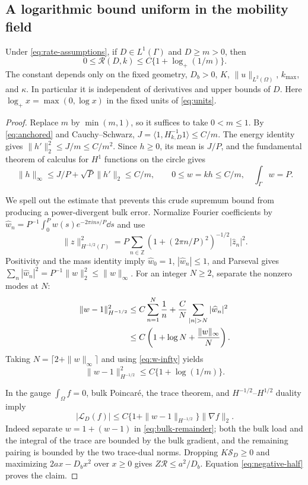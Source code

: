 \subsection{A logarithmic bound uniform in the mobility field}
\begin{theorem}\label{thm:log-remainder}
Under \eqref{eq:rate-assumptions}, if $D\in L^1(\Gamma)$ and
$D\ge m>0$, then
\begin{equation}\label{eq:log-remainder}
 0\le\mathcal R(D,k)\le C\{1+\log_+(1/m)\}.
\end{equation}
The constant depends only on the fixed geometry, $D_b>0$, $K$,
$\|u\|_{L^2(\Omega)}$, $k_{\max}$, and $\kappa$.
In particular it is independent of derivatives and upper bounds of $D$.
Here $\log_+x=\max(0,\log x)$ in the fixed units of \eqref{eq:units}.
\end{theorem}
\begin{proof}
Replace $m$ by $\min(m,1)$, so it suffices to take $0<m\le1$.
By \eqref{eq:anchored} and Cauchy--Schwarz,
$J=\langle1,H_{k,D}^{-1}1\rangle\le C/m$.
The energy identity gives $\|h'\|_2^2\le J/m\le C/m^2$.
Since $h\ge0$, its mean is $J/P$, and the fundamental theorem of
calculus for $H^1$ functions on the circle gives
\begin{equation}\label{eq:w-infty}
 \|h\|_\infty\le J/P+\sqrt P\|h'\|_2\le C/m,
 \qquad 0\le w=kh\le C/m,\quad \int_\Gamma w=P.
\end{equation}

We spell out the estimate that prevents this crude supremum bound from
producing a power-divergent bulk error. Normalize Fourier coefficients
by $\widehat w_n=P^{-1}\int_0^Pw(s)e^{-2\pi i ns/P}\dd s$ and use
\[
 \|z\|_{H^{-1/2}(\Gamma)}^2
   =P\sum_{n\in\mathbb Z}(1+(2\pi n/P)^2)^{-1/2}|\widehat z_n|^2.
\]
Positivity and the mass identity imply $\widehat w_0=1$,
$|\widehat w_n|\le1$, and Parseval gives
$\sum_n|\widehat w_n|^2=P^{-1}\|w\|_2^2\le\|w\|_\infty$.
For an integer $N\ge2$, separate the nonzero modes at $N$:
\begin{align}
 \|w-1\|_{H^{-1/2}}^2
 &\le C\sum_{n=1}^N\frac1n+\frac C N\sum_{|n|>N}|\widehat w_n|^2\notag\\
 &\le C\left(1+\log N+\frac{\|w\|_\infty}{N}\right).
\end{align}
Taking $N=\lceil2+\|w\|_\infty\rceil$ and using
\eqref{eq:w-infty} yields
\begin{equation}\label{eq:negative-half}
 \|w-1\|_{H^{-1/2}}^2\le C\{1+\log(1/m)\}.
\end{equation}

In the gauge $\int_\Omega f=0$, bulk Poincar\'e, the trace theorem,
and $H^{-1/2}$--$H^{1/2}$ duality imply
\[
 |\mathcal L_D(f)|
 \le C\{1+\|w-1\|_{H^{-1/2}}\}\|\nabla f\|_2.
\]
Indeed separate $w=1+(w-1)$ in \eqref{eq:bulk-remainder}; both the
bulk load and the integral of the trace are bounded by the bulk gradient,
and the remaining pairing is bounded by the two trace-dual norms.
Dropping $K\mathcal S_D\ge0$ and maximizing $2ax-D_bx^2$ over
$x\ge0$ gives $Z\mathcal R\le a^2/D_b$.
Equation \eqref{eq:negative-half} proves the claim.
\end{proof}

